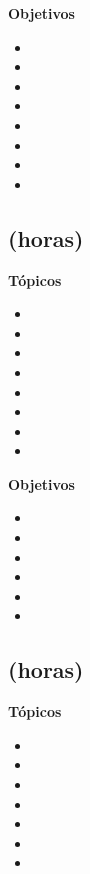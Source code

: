 \textbf{Objetivos}
\begin{itemize}
	\item \ARTRESObjUNO
	\item \ARTRESObjDOS
	\item \ARTRESObjTRES
	\item \ARTRESObjCUATRO
	\item \ARTRESObjCINCO
	\item \ARTRESObjSEIS
	\item \ARTRESObjSIETE
	\item \ARTRESObjOCHO
\end{itemize}

\subsection{\ARCUATRODef  (\ARCUATROHours horas)}\label{sec:BOK-AR4}

\textbf{Tópicos}
\begin{itemize}
	\item \ARCUATROTopicSistemas
	\item \ARCUATROTopicCodificacion
	\item \ARCUATROTopicJerarquia
	\item \ARCUATROTopicOrganizacion
	\item \ARCUATROTopicLatencia
	\item \ARCUATROTopicMemorias
	\item \ARCUATROTopicMemoria
	\item \ARCUATROTopicManejo
\end{itemize}

\textbf{Objetivos}
\begin{itemize}
	\item \ARCUATROObjUNO
	\item \ARCUATROObjDOS
	\item \ARCUATROObjTRES
	\item \ARCUATROObjCUATRO
	\item \ARCUATROObjCINCO
	\item \ARCUATROObjSEIS
\end{itemize}

\subsection{\ARCINCODef  (\ARCINCOHours horas)}\label{sec:BOK-AR5}

\textbf{Tópicos}
\begin{itemize}
	\item \ARCINCOTopicFundamentos
	\item \ARCINCOTopicEstructuras
	\item \ARCINCOTopicAlmacenamiento
	\item \ARCINCOTopicBuses
	\item \ARCINCOTopicIntroduccion
	\item \ARCINCOTopicSoporte
	\item \ARCINCOTopicArquitecturas
\end{itemize}

